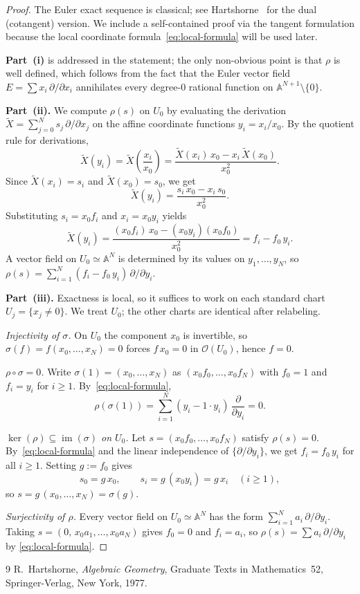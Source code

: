 \documentclass[11pt]{article}
\theoremstyle{plain}
\newcommand{\OO}{\mathcal{O}}
\begin{document}
\begin{proof}
The Euler exact sequence is classical; see Hartshorne~\cite[Theorem~II.8.13]{Hartshorne}
for the dual (cotangent) version.  We include a self-contained proof via the
tangent formulation because the local coordinate formula~\eqref{eq:local-formula}
will be used later.

\medskip
\noindent\textbf{Part~(i)} is addressed in the statement; the only non-obvious
point is that $\rho$ is well defined, which follows from the fact that the Euler
vector field $E=\sum x_i\,\partial/\partial x_i$ annihilates every degree-$0$
rational function on $\mathbb{A}^{N+1}\setminus\{0\}$.

\medskip
\noindent\textbf{Part~(ii).}
We compute $\rho(s)$ on $U_0$ by evaluating the derivation
$\widetilde{X}=\sum_{j=0}^N s_j\,\partial/\partial x_j$
on the affine coordinate functions $y_i=x_i/x_0$.
By the quotient rule for derivations,
\[
\widetilde{X}(y_i)
=\widetilde{X}\!\left(\frac{x_i}{x_0}\right)
=\frac{\widetilde{X}(x_i)\,x_0 - x_i\,\widetilde{X}(x_0)}{x_0^2}.
\]
Since $\widetilde{X}(x_i)=s_i$ and $\widetilde{X}(x_0)=s_0$, we get
\[
\widetilde{X}(y_i)=\frac{s_i\, x_0-x_i\, s_0}{x_0^2}.
\]
Substituting $s_i=x_0 f_i$ and $x_i=x_0 y_i$ yields
\[
\widetilde{X}(y_i)
=\frac{(x_0 f_i)\,x_0-(x_0 y_i)(x_0 f_0)}{x_0^2}
=f_i-f_0\, y_i.
\]
A vector field on $U_0\simeq \mathbb{A}^N$ is determined by its values on
$y_1,\dots,y_N$, so
$\rho(s)=\sum_{i=1}^N (f_i-f_0\, y_i)\,\partial/\partial y_i$.

\medskip
\noindent\textbf{Part~(iii).}
Exactness is local, so it suffices to work on each standard chart
$U_j=\{x_j\neq 0\}$.  We treat $U_0$; the other charts are identical
after relabeling.

\smallskip
\emph{Injectivity of $\sigma$.}\;
On $U_0$ the component $x_0$ is invertible, so $\sigma(f)=f(x_0,\dots,x_N)=0$
forces $f\,x_0=0$ in $\OO(U_0)$, hence $f=0$.

\smallskip
\emph{$\rho\circ\sigma=0$.}\;
Write $\sigma(1)=(x_0,\dots,x_N)$ as $(x_0 f_0,\dots,x_0 f_N)$ with $f_0=1$
and $f_i=y_i$ for $i\ge 1$.  By~\eqref{eq:local-formula},
\[
\rho(\sigma(1))
=\sum_{i=1}^N (y_i-1\cdot y_i)\,\frac{\partial}{\partial y_i}=0.
\]

\smallskip
\emph{$\ker(\rho)\subseteq \operatorname{im}(\sigma)$ on $U_0$.}\;
Let $s=(x_0 f_0,\dots,x_0 f_N)$ satisfy $\rho(s)=0$.
By~\eqref{eq:local-formula} and the linear independence of
$\{\partial/\partial y_i\}$, we get $f_i=f_0\,y_i$ for all $i\ge 1$.
Setting $g:=f_0$ gives
\[
s_0=g\,x_0,\qquad s_i=g\,(x_0 y_i)=g\,x_i \quad(i\ge 1),
\]
so $s=g\,(x_0,\dots,x_N)=\sigma(g)$.

\smallskip
\emph{Surjectivity of $\rho$.}\;
Every vector field on $U_0\simeq\mathbb{A}^N$ has the form
$\sum_{i=1}^N a_i\,\partial/\partial y_i$.  Taking $s=(0,\,x_0 a_1,\dots,x_0 a_N)$
gives $f_0=0$ and $f_i=a_i$, so $\rho(s)=\sum a_i\,\partial/\partial y_i$ by
\eqref{eq:local-formula}.
\end{proof}

\begin{thebibliography}{9}
R.~Hartshorne,
\emph{Algebraic Geometry},
Graduate Texts in Mathematics~52,
Springer-Verlag, New York, 1977.
\end{thebibliography}
\end{document}

